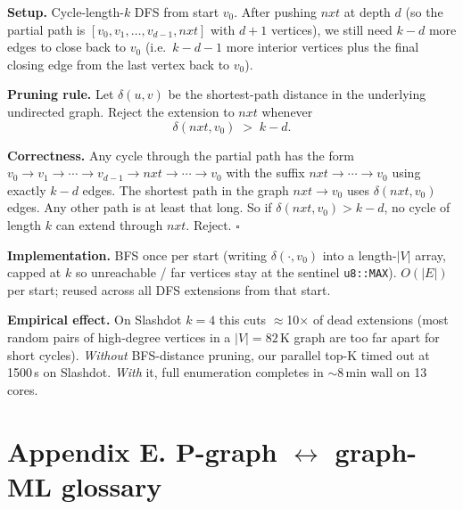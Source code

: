 \documentclass[11pt,a4paper]{article}
\newcommand{\code}[1]{\texttt{\small #1}}
\begin{document}
\textbf{Setup.} Cycle-length-$k$ DFS from start $v_0$. After pushing
$\mathit{nxt}$ at depth $d$ (so the partial path is
$[v_0, v_1, \ldots, v_{d-1}, \mathit{nxt}]$ with $d{+}1$ vertices),
we still need $k - d$ more edges to close back to $v_0$ (i.e.\
$k - d - 1$ more interior vertices plus the final closing edge from
the last vertex back to $v_0$).

\textbf{Pruning rule.} Let $\delta(u, v)$ be the shortest-path
distance in the underlying undirected graph. Reject the extension
to $\mathit{nxt}$ whenever
\begin{equation}
\delta(\mathit{nxt}, v_0) \;>\; k - d.
\end{equation}

\textbf{Correctness.} Any cycle through the partial path has the
form $v_0 \to v_1 \to \cdots \to v_{d-1} \to \mathit{nxt} \to
\cdots \to v_0$ with the suffix $\mathit{nxt} \to \cdots \to v_0$
using exactly $k - d$ edges. The shortest path in the graph
$\mathit{nxt} \rightarrow v_0$ uses $\delta(\mathit{nxt}, v_0)$
edges. Any other path is at least that long. So if
$\delta(\mathit{nxt}, v_0) > k - d$, no cycle of length $k$ can
extend through $\mathit{nxt}$. Reject. $\square$

\textbf{Implementation.} BFS once per start (writing
$\delta(\cdot, v_0)$ into a length-$|V|$ array, capped at $k$ so
unreachable / far vertices stay at the sentinel
\code{u8::MAX}). $O(|E|)$ per start; reused across all DFS
extensions from that start.

\textbf{Empirical effect.} On Slashdot $k{=}4$ this cuts
$\approx$10$\times$ of dead extensions (most random pairs of
high-degree vertices in a $|V|{=}82$\,K graph are too far apart for
short cycles). \emph{Without} BFS-distance pruning, our parallel
top-K timed out at 1500\,s on Slashdot. \emph{With} it, full
enumeration completes in $\sim$8\,min wall on 13 cores.

\section*{Appendix E. P-graph $\leftrightarrow$ graph-ML glossary}
\end{document}

